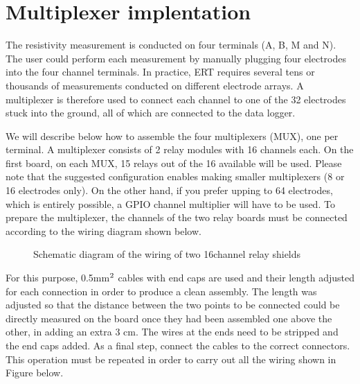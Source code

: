 \documentclass[letterpaper,10pt,english]{sphinxmanual}
\let\sphinxpxdimen\pdfpxdimen\else\newdimen\sphinxpxdimen
\begin{document}
\section{Multiplexer implentation}
\label{\detokenize{V2_00:multiplexer-implentation}}
\sphinxAtStartPar
The resistivity measurement is conducted on four terminals (A, B, M and N). The user could perform each measurement
by manually plugging four electrodes into the four channel terminals. In practice, ERT requires several tens or thousands
of measurements conducted on different electrode arrays. A multiplexer is therefore used to connect each channel to one of
the 32 electrodes stuck into the ground, all of which are connected to the data logger.

\sphinxAtStartPar
We will describe below how to assemble the four multiplexers (MUX), one per terminal. A multiplexer consists of 2 relay
modules with 16 channels each. On the first board, on each MUX, 15 relays out of the 16 available will be used. Please note that the suggested
configuration enables making smaller multiplexers (8 or 16 electrodes only). On the other hand, if you prefer upping to 64 electrodes,
which is entirely possible, a GPIO channel multiplier will have to be used.
To prepare the multiplexer, the channels of the two relay boards must be connected according to the wiring diagram shown below.

\begin{figure}[htbp]
\centering
\capstart

\noindent\sphinxincludegraphics[width=800\sphinxpxdimen,height=500\sphinxpxdimen]{{multiplexer_implementation}.jpg}
\caption{Schematic diagram of the wiring of two 16\sphinxhyphen{}channel relay shields}\label{\detokenize{V2_00:id6}}\end{figure}

\sphinxAtStartPar
For this purpose, 0.5\sphinxhyphen{}mm\(\sp{\text{2}}\) cables with end caps are used and their length adjusted for each connection in order to produce a clean assembly.
The length was adjusted so that the distance between the two points to be connected could be directly measured on the board once they had
been assembled one above the other, in adding an extra 3 cm. The wires at the ends need to be stripped and the end caps added.
As a final step, connect the cables to the correct connectors. This operation must be repeated in order to carry out all the wiring shown in Figure below.
\end{document}
